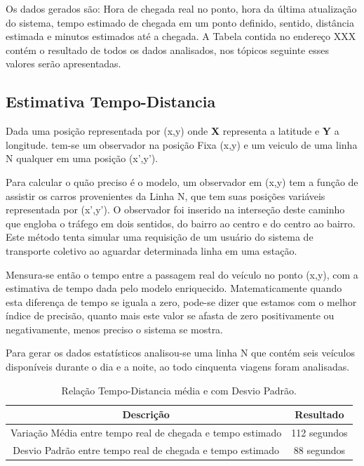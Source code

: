 \documentclass[12pt]{article}
\begin{document}
Os dados gerados são: Hora de chegada real no ponto, hora da última atualização do sistema, tempo estimado de chegada em um ponto definido, sentido, distância estimada e minutos estimados até a chegada. A Tabela contida no endereço XXX contém o resultado de todos os dados analisados, nos tópicos seguinte esses valores serão apresentadas.

\subsection{Estimativa Tempo-Distancia} \label{sec:tmpDist}
Dada uma posição representada por (x,y) onde \textbf{X} representa a latitude e \textbf{Y} a longitude. tem-se um observador na posição Fixa (x,y) e um veiculo de uma linha N qualquer em uma posição (x',y').

Para calcular o quão preciso é o modelo, um observador em (x,y) tem a função de assistir os carros provenientes da Linha N, que tem suas posições variáveis representada por (x',y'). O observador foi inserido na interseção deste caminho que engloba o tráfego em dois sentidos, do bairro ao centro e do centro ao bairro. Este método tenta simular uma requisição de um usuário do sistema de transporte coletivo ao aguardar determinada linha em uma estação. 

Mensura-se então o tempo entre a passagem real do veículo no ponto (x,y), com a estimativa de tempo dada pelo modelo enriquecido. Matematicamente quando esta diferença de tempo se iguala a zero, pode-se dizer que estamos com o melhor índice de precisão, quanto mais este valor se afasta de zero positivamente ou negativamente, menos preciso o sistema se mostra.

Para gerar os dados estatísticos analisou-se uma linha N que contém seis veículos disponíveis durante o dia e a noite, ao todo cinquenta viagens foram analisadas.

\begin{table}[h!]
  \centering
	\begin{tabular}{|c|c|}
      \hline
      Descrição & Resultado \\ \hline
      Variação Média entre tempo real de chegada e tempo estimado & 112 segundos \\ 
      Desvio Padrão entre tempo real de chegada e tempo estimado & 88 segundos \\
      \hline
	\end{tabular}
  \caption{Relação Tempo-Distancia média e com Desvio Padrão.}
  \label{tab:variacoes}
\end{table}
\end{document}
